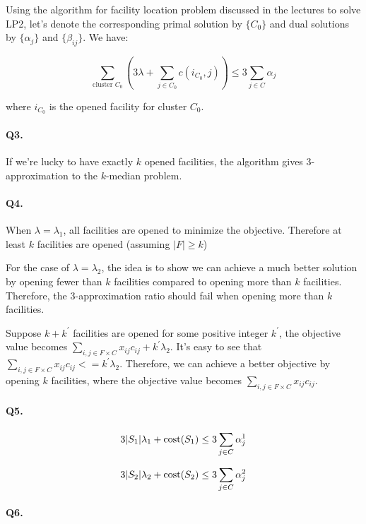 \documentclass{article}
\begin{document}
Using the algorithm for facility location problem discussed in the lectures to solve LP2, let's denote the corresponding primal solution by $\{C_0\}$ and dual solutions by $\{\alpha_j\}$ and $\{\beta_{ij}\}$.
We have:

\[
  \sum_{\text{cluster } C_0} (3\lambda + \sum_{j \in C_0} c(i_{C_0}, j)) \le 3 \sum_{j \in C} \alpha_j
\]

where $i_{C_0}$ is the opened facility for cluster $C_0$.

\paragraph{Q3. }

If we're lucky to have exactly $k$ opened facilities, the algorithm gives 3-approximation to the $k$-median problem. 

\paragraph{Q4. }

When $\lambda=\lambda_1$, all facilities are opened to minimize the objective.
Therefore at least $k$ facilities are opened (assuming $|F|\ge k$)

For the case of $\lambda=\lambda_2$, the idea is to show we can achieve a much better solution by opening fewer than $k$ facilities compared to opening more than $k$ facilities. Therefore, the $3$-approximation ratio should fail when opening more than $k$ facilities. 

Suppose $k+k^{'}$ facilities are opened for some positive integer $k^{'}$, the objective value becomes $\sum_{i, j \in F\times C} x_{ij} c_{ij} + k^{'} \lambda_2$.
It's easy to see that $\sum_{i, j \in F\times C} x_{ij} c_{ij} <= k^{'} \lambda_2$.
Therefore, we can achieve a better objective by opening $k$ facilities, where the objective value becomes $\sum_{i, j \in F\times C} x_{ij} c_{ij}$.


\paragraph{Q5. }

\[
  3 |S_1|\lambda_1 + \text{cost}(S_1)  \le 3\sum_{j \in C} \alpha^1_j
\]

\[
  3 |S_2|\lambda_2 + \text{cost}(S_2)  \le 3\sum_{j \in C} \alpha^2_j
\]  

\paragraph{Q6. }
\end{document}
